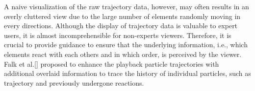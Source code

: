 A naive visualization of the raw trajectory data, however, may often results in an overly cluttered view due to the large number of elements randomly moving in every directions.
Although the display of trajectory data is valuable to expert users, it is almost incomprehensible for non-experts viewers.
Therefore, it is crucial to provide guidance to ensure that the underlying information, i.e., which elements react with each others and in which order, is perceived by the viewer.
Falk et al.[] proposed to enhance the playback particle trajectories with additional overlaid information to trace the history of individual particles, such as trajectory and previously undergone reactions.


%
%
%
%
%
%
%
